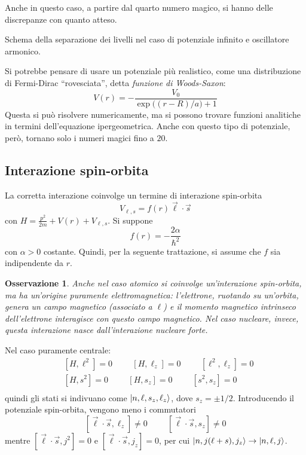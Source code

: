 \documentclass[11pt, a4paper]{scrartcl}
\theoremstyle{style}
\newtheorem{osservazione}{Osservazione}[section]
\newenvironment{boxenv}[1][]{
    \begin{eqbox}[#1]
    }{
   \end{eqbox}
}
\numberwithin{equation}{subsection}
\begin{document}
\noindent Anche in questo caso, a partire dal quarto numero magico, si hanno delle discrepanze con quanto atteso.
\begin{boxenv}[]
Schema della separazione dei livelli nel caso di potenziale infinito e oscillatore armonico.
\end{boxenv}
\noindent Si potrebbe pensare di usare un potenziale pi\`u realistico, come una distribuzione di Fermi-Dirac ``rovesciata'', detta \textit{funzione di Woods-Saxon}:
\[
V(r) = - \frac{V_0}{\exp\big((r - R) / a\big) +1}
\] 
Questa si pu\`o risolvere numericamente, ma si possono trovare funzioni analitiche in termini dell'equazione ipergeometrica.
Anche con questo tipo di potenziale, per\`o, tornano solo i numeri magici fino a $20$.

\subsection{Interazione spin-orbita}

La corretta interazione coinvolge un termine di interazione spin-orbita 
\[
V_{\ell ,s} = f(r) \vec{\ell}\cdot \vec{s} 
\] 
con $H = \frac{p^2}{2m} + V(r) + V_{\ell ,s}$.
Si suppone 
\[
f(r) = - \frac{2\alpha }{\hbar ^2}
\] 
con $\alpha >0$ costante.
Quindi, per la seguente trattazione, si assume che $f$ sia indipendente da $r$.
\begin{osservazione}
Anche nel caso atomico si coinvolge un'interazione spin-orbita, ma ha un'origine puramente elettromagnetica: l'elettrone, ruotando su un'orbita, genera un campo magnetico (associato a $\ell $) e il momento magnetico intrinseco dell'elettrone interagisce con questo campo magnetico.
Nel caso nucleare, invece, questa interazione nasce dall'interazione nucleare forte.
\end{osservazione}
\noindent Nel caso puramente centrale:
\[
\begin{split}
	& \left[ H , \ell ^2 \right] = 0 \hspace{1cm} [H , \ell _z] = 0 \hspace{1cm} [\ell ^2, \ell _z] = 0\\
	& \left[ H , s ^2 \right] = 0 \hspace{1cm} [H , s_z] = 0 \hspace{1cm} [s^2, s _z] = 0\\
\end{split}
\] 
quindi gli stati si indivuano come $\ket{n ,\ell ,s_z,\ell _z} $, dove $s_z = \pm 1 / 2$.
Introducendo il potenziale spin-orbita, vengono meno i commutatori
\[
	[\vec{\ell }\cdot \vec{s}, \ell _z ] \neq 0 \hspace{1cm} [\vec{\ell }\cdot \vec{s}, s_z] \neq 0 
\] 
mentre $[\vec{\ell }\cdot \vec{s}, j^2 ] = 0$ e $[\vec{\ell }\cdot \vec{s},j_z] = 0$, per cui $\ket{n , j(\ell +s),j_z} \to \ket{n,\ell ,j} $.
\end{document}
